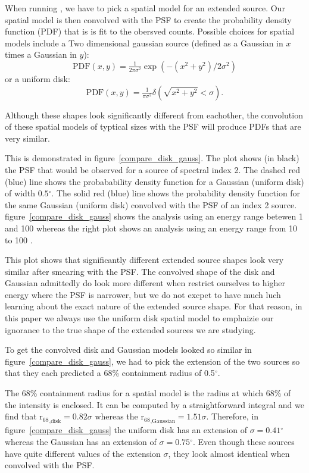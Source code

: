 \documentclass[preprint]{aastex}
\newcommand{\gev}{\text{GeV}\xspace}
\newcommand{\rsixeight}{{\ensuremath{\text{r}_{68}}}\xspace}
\renewcommand{\deg}{\ensuremath{^\circ}\xspace}
\newcommand{\pointlike}{\text{\em pointlike}\xspace}
\begin{document}

When running \pointlike, we have to pick a spatial model for an extended
source. Our spatial model is then convolved with the PSF to create the
probability density function (PDF) that is is fit to the obersved counts.
Possible choices for spatial models include a Two dimensional gaussian
source (defined as a Gaussian in $x$ times a Gaussian in $y$):
\begin{equation}
  \text{PDF}(x,y)=\tfrac{1}{2\pi\sigma^2}\exp\left(-(x^2+y^2)/2\sigma^2\right)
\end{equation}
or a uniform disk:
\begin{equation}
  \text{PDF}(x,y)=\tfrac{1}{\pi\sigma^2}\delta\left(\sqrt{x^2+y^2}<\sigma\right).
\end{equation}

Although these shapes look significantly different from eachother, the
convolution of these spatial models of typtical sizes with the PSF will
produce PDFs that are very similar.

This is demonstrated in figure~\ref{compare_disk_gauss}.  The plot shows
(in black) the PSF that would be observed for a source of spectral
index 2. The dashed red (blue) line shows the probabability density
function for a Gaussian (uniform disk) of width $0.5\deg$.  The solid
red (blue) line shows the probability density function for the same
Gaussian (uniform disk) convolved with the PSF of an index 2 source.
figure~\ref{compare_disk_gauss} shows the analysis using an energy range
betewen 1 \gev and 100 \gev whereas the right plot shows an analysis using an
energy range from 10 \gev to 100 \gev.

This plot shows that significantly different extended source shapes
look very similar after smearing with the PSF. The convolved shape of
the disk and Gaussian admittedly do look more different when restrict
ourselves to higher energy where the PSF is narrower, but we do not
excpet to have much luch learning about the exact nature of the
extended source shape. For that reason, in this paper we always use
the uniform disk spatial model to emphaizie our ignorance to the true
shape of the extended sources we are studying.

To get the convolved disk and Gaussian models looked so similar in
figure~\ref{compare_disk_gauss}, we had to pick the extension of the two
sources so that they each predicted a 68\% containment radius of 0.5\deg.

The 68\% containment radius for a spatial model is
the radius at which 68\% of the intensity is enclosed.
It can be computed by a straightforward integral and we
find that $\rsixeight_\text{,disk}=0.82\sigma$ whereas
the $\rsixeight_\text{,Gaussian}=1.51\sigma$. Therefore, in
figure~\ref{compare_disk_gauss} the uniform disk has an extension
of $\sigma=0.41\deg$ whereas the Gaussian has an extension of
$\sigma=0.75\deg$. Even though these sources have quite different
values of the extension $\sigma$, they look almost identical when convolved
with the PSF.
\end{document}
